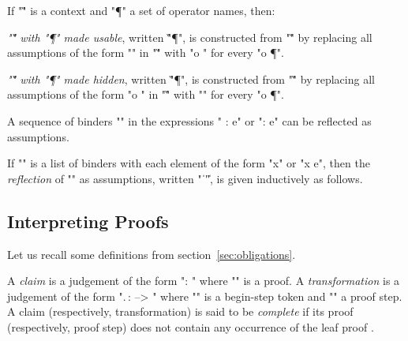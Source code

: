 \documentclass[a4paper]{easychair}
\begin{document}
\pagebreak[2]

\begin{defn} \label{defn:use/hide}
If "\G" is a context and "\P" a set of operator names, then:
  \begin{ecom}
  \item \emph{"\G" with "\P" made usable}, written "\G \USING \P", is
    constructed from "\G" by replacing all assumptions of the form
    "" in "\G" with "o \DEF \delta" for every "o
    \in \P".
  \item \emph{"\G" with "\P" made hidden}, written "\G \HIDING \P", is
    constructed from "\G" by replacing all assumptions of the form "o
    \DEF \delta" in "\G" with "" for every "o \in
    \P".
  \end{ecom}
\end{defn}

\def\refl#1{\bigl\|\,#1\,\bigr\|}

\noindent A sequence of binders "\vec \beta" in the \tlatwo expressions "\forall
\vec \beta : e" or "\exists \vec \beta : e" can be reflected as
assumptions.

\begin{defn} \label{defn:binding-reflection}
If "\vec \beta" is a list of binders with each element of the form
  "x" or "x \in e", then the \emph{reflection} of "\vec \beta" as
  assumptions, written "\refl{\vec \beta}", is given inductively as
  follows.
  
\end{defn}

\subsection{Interpreting Proofs}
\label{apx:proof-transformation}

Let us recall some definitions from section~\ref{sec:obligations}.

\begin{defn} \label{defn:check/trans-def}
A \emph{claim} is a judgement of the form "\pi : "
  where "\pi" is a \tlatwo proof. A \emph{transformation} is a
  judgement of the form "\sigma.\,\tau :  --> " where "\sigma" is a begin-step token and "\tau" a proof
  step. A claim (respectively, transformation) is said to be
  \emph{complete} if its proof (respectively, proof step) does not
  contain any occurrence of the leaf proof \OMITTED.
\end{defn}
\end{document}
